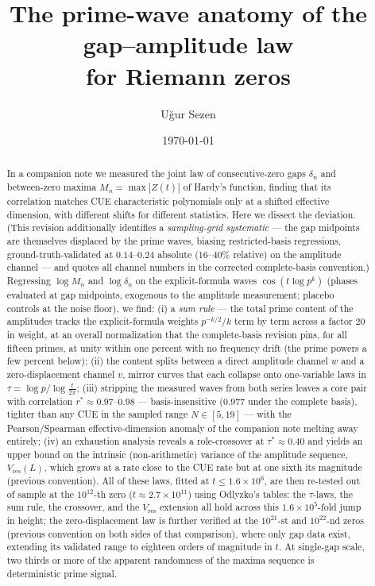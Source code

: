 \documentclass[12pt]{amsart}
\title[Prime-wave anatomy of the gap--amplitude law]{The prime-wave
anatomy of the gap--amplitude law\\ for Riemann zeros}
\author{U\u{g}ur Sezen}
\date{\today}
\begin{document}
\begin{abstract}
In a companion note we measured the joint law of consecutive-zero gaps
$\delta_n$ and between-zero maxima $M_n = \max |Z(t)|$ of Hardy's function,
finding that its correlation matches CUE characteristic polynomials only at
a shifted effective dimension, with different shifts for different
statistics. Here we dissect the deviation. (This revision additionally
identifies a \emph{sampling-grid systematic} --- the gap midpoints are
themselves displaced by the prime waves, biasing restricted-basis
regressions, ground-truth-validated at $0.14$--$0.24$ absolute
($16$--$40\%$ relative) on the amplitude channel --- and quotes all channel numbers in the corrected
complete-basis convention.) Regressing $\log M_n$ and
$\log \delta_n$ on the explicit-formula waves $\cos(t \log p^k)$ (phases
evaluated at gap midpoints, exogenous to the amplitude measurement;
placebo controls at the noise floor), we find: (i) a \emph{sum rule} --- the
total prime content of the amplitudes tracks the explicit-formula weights
$p^{-k/2}/k$ term by term across a factor $20$ in weight, at an overall
normalization that the complete-basis revision pins, for all fifteen
primes, at unity within one percent with no frequency drift (the prime
powers a few percent below); (ii) the content splits between a
direct amplitude channel $w$ and a zero-displacement channel $v$, mirror
curves that each collapse onto one-variable laws in
$\tau = \log p / \log\frac{t}{2\pi}$; (iii) stripping the measured waves
from both series leaves a core pair with correlation $r^* \approx 0.97$--$0.98$
--- basis-insensitive ($0.977$ under the complete basis), tighter than
any CUE in the sampled range $N \in [5, 19]$ --- with the Pearson/Spearman
effective-dimension anomaly of the companion note melting away entirely;
(iv) an exhaustion analysis reveals a role-crossover at
$\tau^* \approx 0.40$ and yields an upper bound on the intrinsic
(non-arithmetic) variance of the amplitude sequence,
$V_{\mathrm{res}}(L)$, which grows at a rate close to the CUE rate but
at one sixth its magnitude (previous convention). All of these laws, fitted at
$t \le 1.6\times10^6$, are then re-tested out of sample at the
$10^{12}$-th zero ($t \approx 2.7\times10^{11}$) using Odlyzko's tables:
the $\tau$-laws, the sum rule, the crossover, and the
$V_{\mathrm{res}}$ extension all hold across this $1.6\times10^5$-fold
jump in height; the zero-displacement law is further verified at the
$10^{21}$-st and $10^{22}$-nd zeros (previous convention on both sides
of that comparison), where only gap data exist, extending its validated
range to eighteen orders of magnitude in $t$. At single-gap scale, two thirds or more of the apparent randomness of
the maxima sequence is deterministic prime signal.
\end{abstract}
\end{document}
